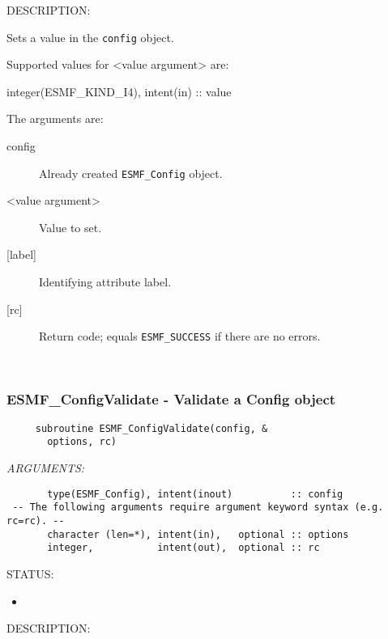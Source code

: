 {\sf DESCRIPTION:\\ }

 
    Sets a value in the {\tt config} object.
  
        Supported values for <value argument> are:
        \begin{description}
        \item integer(ESMF\_KIND\_I4), intent(in)            :: value
        \end{description}
  
     The arguments are:
       \begin{description}
     \item [config]
       Already created {\tt ESMF\_Config} object.
     \item [<value argument>]
       Value to set. 
     \item [{[label]}]
       Identifying attribute label. 
     \item [{[rc]}]
       Return code; equals {\tt ESMF\_SUCCESS} if there are no errors.
     \end{description}
   
 
\mbox{}\hrulefill\ 
 

  \subsubsection [ESMF\_ConfigValidate] {ESMF\_ConfigValidate - Validate a Config object}


  
\begin{verbatim}     subroutine ESMF_ConfigValidate(config, &
       options, rc)
 \end{verbatim}{\em ARGUMENTS:}
\begin{verbatim}       type(ESMF_Config), intent(inout)          :: config 
 -- The following arguments require argument keyword syntax (e.g. rc=rc). --
       character (len=*), intent(in),   optional :: options
       integer,           intent(out),  optional :: rc \end{verbatim}
{\sf STATUS:}
   \begin{itemize}
   \item{}
   \end{itemize}
  
{\sf DESCRIPTION:\\ }

